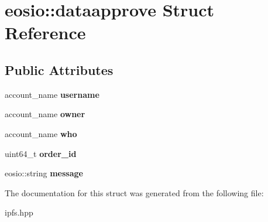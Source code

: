 \hypertarget{structeosio_1_1dataapprove}{}\section{eosio\+:\+:dataapprove Struct Reference}
\label{structeosio_1_1dataapprove}
\subsection*{Public Attributes}
\begin{DoxyCompactItemize}
\item 
\mbox{\label{structeosio_1_1dataapprove_aa3082c950b110a09fe5dfb57f5497c24}} 
account\+\_\+name {\bfseries username}
\item 
\mbox{\label{structeosio_1_1dataapprove_abb8d0b03c6512b8015ca2d20640cdaa4}} 
account\+\_\+name {\bfseries owner}
\item 
\mbox{\label{structeosio_1_1dataapprove_aa283c8477272fdc910e75ed9aa6f8adf}} 
account\+\_\+name {\bfseries who}
\item 
\mbox{\label{structeosio_1_1dataapprove_ab44e214cadc1b79f420b068e5da89902}} 
uint64\+\_\+t {\bfseries order\+\_\+id}
\item 
\mbox{\label{structeosio_1_1dataapprove_adbb81083e2abbe327554e1d05a7cbeae}} 
eosio\+::string {\bfseries message}
\end{DoxyCompactItemize}


The documentation for this struct was generated from the following file\+:\begin{DoxyCompactItemize}
\item 
ipfs.\+hpp\end{DoxyCompactItemize}
